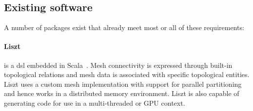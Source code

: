 \documentclass[thesis]{subfiles}
\begin{document}
%
%
%

\subsection{Existing software}


A number of packages exist that already meet most or all of these requirements:

\paragraph{Liszt}{
  is a \gls{dsl} embedded in Scala~\cite{devitoLisztDomainSpecific2011}.
  Mesh connectivity is expressed through built-in topological relations and mesh data is associated with specific topological entities.
  Liszt uses a custom mesh implementation with support for parallel partitioning and hence works in a distributed memory environment.
  Liszt is also capable of generating code for use in a multi-threaded or GPU context.
}
\end{document}
